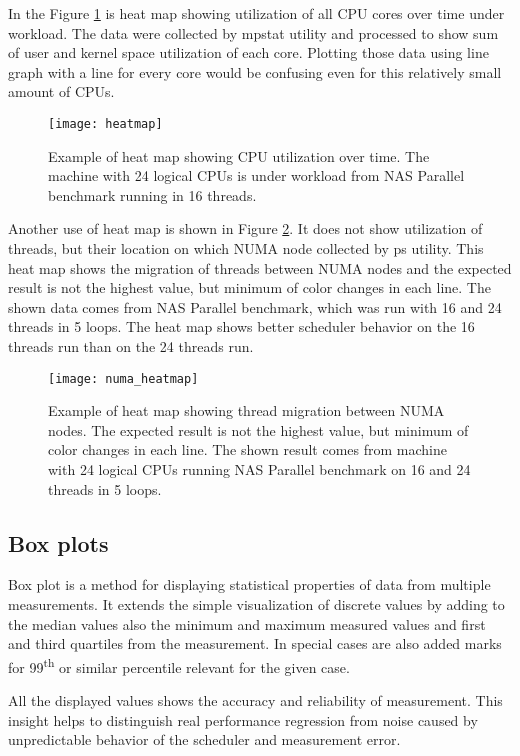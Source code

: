 In the Figure \ref{fig:heatmap} is heat map showing utilization of all CPU cores over
time under workload. The data were collected by mpstat utility and processed to
show sum of user and kernel space utilization of each core. Plotting those data
using line graph with a line for every core would be confusing even for this
relatively small amount of CPUs.

\begin{figure}
  \centering
  \texttt{[image: heatmap]}
  \caption{Example of heat map showing CPU utilization over time. The machine
    with 24 logical CPUs is under workload from NAS Parallel benchmark running
    in 16 threads.}
  \label{fig:heatmap}
\end{figure}

Another use of heat map is shown in Figure \ref{fig:numa_heatmap}. It does not
show utilization of threads, but their location on which NUMA node collected by
ps utility. This heat map shows the migration of threads between NUMA nodes and
the expected result is not the highest value, but minimum of color changes in
each line. The shown data comes from NAS Parallel benchmark, which was run with
16 and 24 threads in 5 loops. The heat map shows better scheduler behavior on
the 16 threads run than on the 24 threads run.

\begin{figure}
  \centering
  \texttt{[image: numa\_heatmap]}
  \caption{Example of heat map showing thread migration between NUMA nodes. The
    expected result is not the highest value, but minimum of color changes in
    each line. The shown result comes from machine with 24 logical CPUs running
    NAS Parallel benchmark on 16 and 24 threads in 5 loops.}
  \label{fig:numa_heatmap}
\end{figure}

\subsection{Box plots}
Box plot is a method for displaying statistical properties of data from multiple
measurements. It extends the simple visualization of discrete values by adding
to the median values also the minimum and maximum measured values and first and
third quartiles from the measurement. In special cases are also added marks for
99\textsuperscript{th} or similar percentile relevant for the given case.

All the displayed values shows the accuracy and reliability of measurement. This
insight helps to distinguish real performance regression from noise caused by
unpredictable behavior of the scheduler and measurement error.

